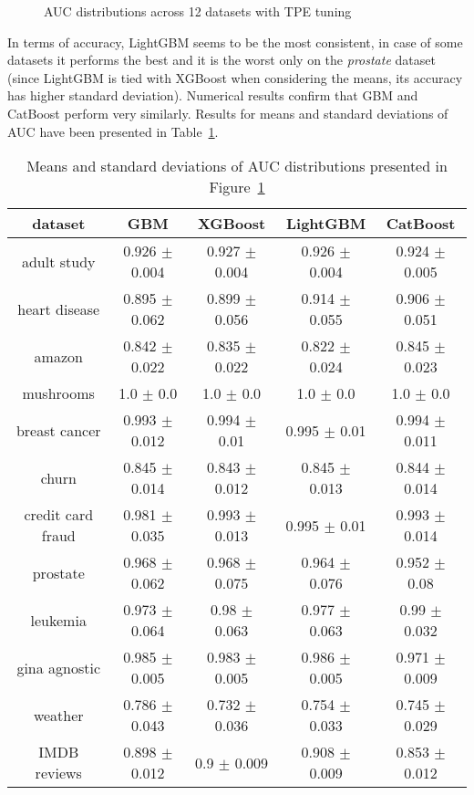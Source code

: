 \documentclass[magisterska, english]{pwr_wmat_praca_dyplomowa}
\theoremstyle{plain}
\numberwithin{theorem}{chapter}
\theoremstyle{definition}
\numberwithin{theorem}{chapter}
\begin{document}
\begin{figure}[H]
	\centering
	\caption{AUC distributions across 12 datasets with TPE tuning}
	\label{fig:tpe_AUC}
\end{figure}

In terms of accuracy, LightGBM seems to be the most consistent, in case of some datasets it performs the best and it is the worst only on the \emph{prostate} dataset (since LightGBM is tied with XGBoost when considering the means, its accuracy has higher standard deviation). Numerical results confirm that GBM and CatBoost perform very similarly. 
Results for means and standard deviations of AUC have been presented in Table~\ref{tab:tpe_AUC}.

\begin{table}[h!]
\centering
\begin{tabular}{|c|c|c|c|c|}
\hline
\textbf{dataset}  & \textbf{GBM}  & \textbf{XGBoost}  & \textbf{LightGBM}  & \textbf{CatBoost} \\ \hline
adult study & 0.926 $\pm$ 0.004 & \cellcolor{green}0.927 $\pm$ 0.004 & 0.926 $\pm$ 0.004 & \cellcolor{red}0.924 $\pm$ 0.005\\ \hline
heart disease & \cellcolor{red}0.895 $\pm$ 0.062 & 0.899 $\pm$ 0.056 & \cellcolor{green}0.914 $\pm$ 0.055 & 0.906 $\pm$ 0.051\\ \hline
amazon & 0.842 $\pm$ 0.022 & 0.835 $\pm$ 0.022 & \cellcolor{red}0.822 $\pm$ 0.024 & \cellcolor{green}0.845 $\pm$ 0.023\\ \hline
mushrooms & 1.0 $\pm$ 0.0 & 1.0 $\pm$ 0.0 & 1.0 $\pm$ 0.0 & 1.0 $\pm$ 0.0\\ \hline
breast cancer & \cellcolor{red}0.993 $\pm$ 0.012 & 0.994 $\pm$ 0.01 & \cellcolor{green}0.995 $\pm$ 0.01 & 0.994 $\pm$ 0.011\\ \hline
churn & 0.845 $\pm$ 0.014 & \cellcolor{red}0.843 $\pm$ 0.012 & \cellcolor{green}0.845 $\pm$ 0.013 & 0.844 $\pm$ 0.014\\ \hline
credit card fraud & \cellcolor{red}0.981 $\pm$ 0.035 & 0.993 $\pm$ 0.013 & \cellcolor{green}0.995 $\pm$ 0.01 & 0.993 $\pm$ 0.014\\ \hline
prostate & \cellcolor{green}0.968 $\pm$ 0.062 & 0.968 $\pm$ 0.075 & 0.964 $\pm$ 0.076 & \cellcolor{red}0.952 $\pm$ 0.08\\ \hline
leukemia & \cellcolor{red}0.973 $\pm$ 0.064 & 0.98 $\pm$ 0.063 & 0.977 $\pm$ 0.063 & \cellcolor{green}0.99 $\pm$ 0.032\\ \hline
gina agnostic & 0.985 $\pm$ 0.005 & 0.983 $\pm$ 0.005 & \cellcolor{green}0.986 $\pm$ 0.005 & \cellcolor{red}0.971 $\pm$ 0.009\\ \hline
weather & \cellcolor{green}0.786 $\pm$ 0.043 & \cellcolor{red}0.732 $\pm$ 0.036 & 0.754 $\pm$ 0.033 & 0.745 $\pm$ 0.029\\ \hline
IMDB reviews & 0.898 $\pm$ 0.012 & 0.9 $\pm$ 0.009 & \cellcolor{green}0.908 $\pm$ 0.009 & \cellcolor{red}0.853 $\pm$ 0.012\\ \hline
\end{tabular}
\caption{Means and standard deviations of AUC distributions presented in Figure~\ref{fig:tpe_AUC}}
\label{tab:tpe_AUC}
\end{table}
\end{document}
